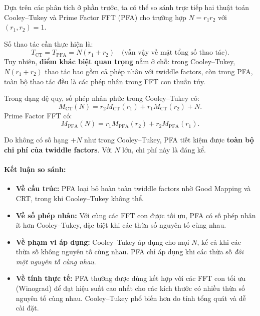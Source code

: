 Dựa trên các phân tích ở phần trước, ta có thể so sánh trực tiếp hai thuật toán Cooley--Tukey và Prime Factor FFT (PFA) cho trường hợp \(N = r_1 r_2\) với \((r_1, r_2) = 1\).

Số thao tác cần thực hiện là:
\begin{equation}
T_{\text{CT}} = T_{\text{PFA}} = N(r_1 + r_2) \quad \text{(vẫn vậy về mặt tổng số thao tác)}.
\end{equation}
Tuy nhiên, \textbf{điểm khác biệt quan trọng} nằm ở chỗ: trong Cooley--Tukey, \(N(r_1 + r_2)\) thao tác bao gồm cả phép nhân với twiddle factors, còn trong PFA, toàn bộ thao tác đều là các phép nhân trong FFT con thuần túy.

Trong dạng đệ quy, số phép nhân phức trong Cooley--Tukey có:
\begin{equation}
M_{\text{CT}}(N) = r_2M_{\text{CT}}(r_1) + r_1M_{\text{CT}}(r_2) + N.
\end{equation}
Prime Factor FFT có:
\begin{equation}
M_{\text{PFA}}(N) = r_1 M_{\text{PFA}}(r_2) + r_2 M_{\text{PFA}}(r_1).
\end{equation}

Do không có số hạng \(+N\) như trong Cooley--Tukey, PFA tiết kiệm được \textbf{toàn bộ chi phí của twiddle factors}. Với \(N\) lớn, chi phí này là đáng kể.

\paragraph{Kết luận so sánh:}
\begin{itemize}
    \item \textbf{Về cấu trúc:} PFA loại bỏ hoàn toàn twiddle factors nhờ Good Mapping và CRT, trong khi Cooley--Tukey không thể.
    \item \textbf{Về số phép nhân:} Với cùng các FFT con được tối ưu, PFA có số phép nhân ít hơn Cooley--Tukey, đặc biệt khi các thừa số nguyên tố cùng nhau.
    \item \textbf{Về phạm vi áp dụng:} Cooley--Tukey áp dụng cho mọi \(N\), kể cả khi các thừa số không nguyên tố cùng nhau. PFA chỉ áp dụng khi các thừa số \textit{đôi một nguyên tố cùng nhau}.
    \item \textbf{Về tính thực tế:} PFA thường được dùng kết hợp với các FFT con tối ưu (Winograd) để đạt hiệu suất cao nhất cho các kích thước có nhiều thừa số nguyên tố cùng nhau. Cooley--Tukey phổ biến hơn do tính tổng quát và dễ cài đặt.
\end{itemize}